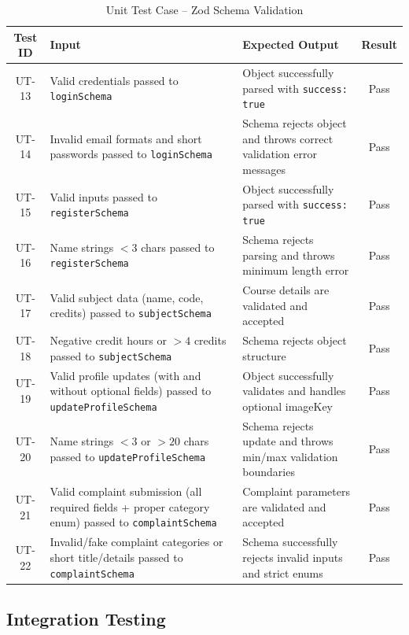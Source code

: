 \begin{table}[H]
\centering
\caption{Unit Test Case – Zod Schema Validation}
\begin{tabularx}{\textwidth}{|c|X|X|c|}
\hline
\textbf{Test ID} & \textbf{Input} & \textbf{Expected Output} & \textbf{Result} \\
\hline
UT-13 & Valid credentials passed to \texttt{loginSchema} & Object successfully parsed with \texttt{success: true} & Pass \\
\hline
UT-14 & Invalid email formats and short passwords passed to \texttt{loginSchema} & Schema rejects object and throws correct validation error messages & Pass \\
\hline
UT-15 & Valid inputs passed to \texttt{registerSchema} & Object successfully parsed with \texttt{success: true} & Pass \\
\hline
UT-16 & Name strings $<3$ chars passed to \texttt{registerSchema} & Schema rejects parsing and throws minimum length error & Pass \\
\hline
UT-17 & Valid subject data (name, code, credits) passed to \texttt{subjectSchema} & Course details are validated and accepted & Pass \\
\hline
UT-18 & Negative credit hours or $>4$ credits passed to \texttt{subjectSchema} & Schema rejects object structure & Pass \\
\hline
UT-19 & Valid profile updates (with and without optional fields) passed to \texttt{updateProfileSchema} & Object successfully validates and handles optional imageKey & Pass \\
\hline
UT-20 & Name strings $<3$ or $>20$ chars passed to \texttt{updateProfileSchema} & Schema rejects update and throws min/max validation boundaries & Pass \\
\hline
UT-21 & Valid complaint submission (all required fields + proper category enum) passed to \texttt{complaintSchema} & Complaint parameters are validated and accepted & Pass \\
\hline
UT-22 & Invalid/fake complaint categories or short title/details passed to \texttt{complaintSchema} & Schema successfully rejects invalid inputs and strict enums & Pass \\
\hline
\end{tabularx}
\end{table}


\subsection{Integration Testing}

